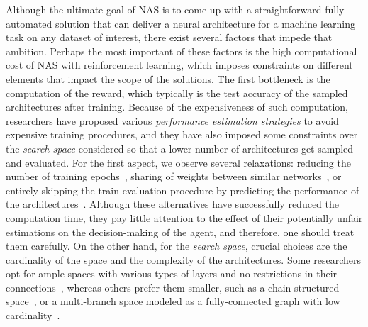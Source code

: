 
Although the ultimate goal of NAS is to come up with a straightforward fully-automated solution that can deliver a neural architecture for a machine learning task on any dataset of interest, there exist several factors that impede that ambition. Perhaps the most important of these factors is the high computational cost of NAS with reinforcement learning, which imposes constraints on different elements that impact the scope of the solutions. The first bottleneck is the computation of the reward, which typically is the test accuracy of the sampled architectures after training. Because of the expensiveness of such computation,  researchers have proposed various \textit{performance estimation strategies} to avoid expensive training procedures, and they have also imposed some constraints over the \textit{search space} considered so that a lower number of architectures get sampled and evaluated. For the first aspect, we observe several relaxations: reducing the number of training epochs~\citep{BakerNAS,BlockQNN}, sharing of weights between similar networks~\citep{PathNAS, ENAS}, or entirely skipping the train-evaluation procedure by predicting the performance of the architectures~\citep{BlockQNN}. Although these alternatives have successfully reduced the computation time, they pay little attention to the effect of their potentially unfair estimations on the decision-making of the agent, and therefore, one should treat them carefully. On the other hand, for the \textit{search space}, crucial choices are the cardinality of the space and the complexity of the architectures. Some researchers opt for ample spaces with various types of layers and no restrictions in their connections~\citep{ZophNAS1,ZophNAS2,BlockQNN}, whereas others prefer them smaller, such as a chain-structured space~\citep{BakerNAS}, or a multi-branch space modeled as a fully-connected graph with low cardinality~\citep{ENAS}.

